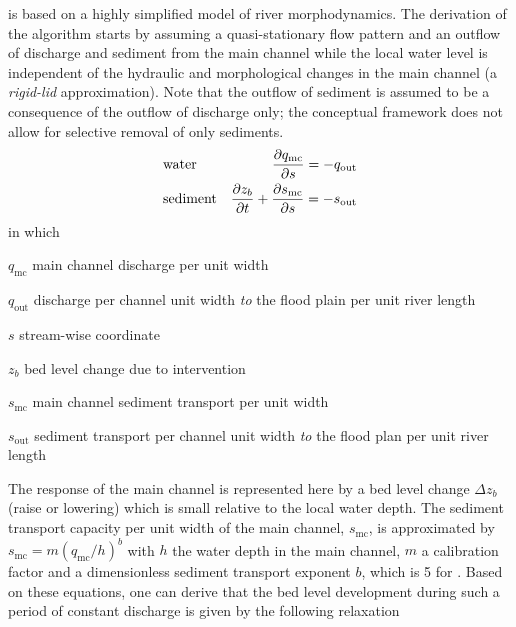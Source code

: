 \dfastmi is based on a highly simplified model of river morphodynamics.
The derivation of the algorithm starts by assuming a quasi-stationary flow pattern and an outflow of discharge and sediment from the main channel while the local water level is independent of the hydraulic and morphological changes in the main channel (a \emph{rigid-lid} approximation).
Note that the outflow of sediment is assumed to be a consequence of the outflow of discharge only; the conceptual framework does not allow for selective removal of only sediments.
%
\begin{align}
&\text{water} & \pdiff{q_\text{mc}}{s} = -q_\text{out} \label{Eq:MassConcWater} \\
&\text{sediment} & \pdiff{z_b}{t} + \pdiff{s_\text{mc}}{s} = -s_\text{out} \label{Eq:MassConcWater}
\end{align}
%
in which
%
\begin{symbollist}
\item[$q_\text{mc}$] main channel discharge per unit width 
\item[$q_\text{out}$] discharge per channel unit width \emph{to} the flood plain per unit river length 
\item[$s$] stream-wise coordinate 
\item[$z_b$] bed level change due to intervention 
\item[$s_\text{mc}$] main channel sediment transport per unit width 
\item[$s_\text{out}$] sediment transport per channel unit width \emph{to} the flood plan per unit river length 
\end{symbollist}
%
The response of the main channel is represented here by a bed level change $\Delta z_b$  (raise or lowering) which is small relative to the local water depth.
The sediment transport capacity per unit width of the main channel, $s_\text{mc}$, is approximated by $s_\text{mc} = m \left ( q_\text{mc} / h \right )^b$ with $h$ the water depth  in the main channel, $m$ a calibration factor  and a dimensionless sediment transport exponent $b$, which is 5 for \citet{Engelundh67}.
Based on these equations, one can derive that the bed level development during such a period of constant discharge is given by the following relaxation
